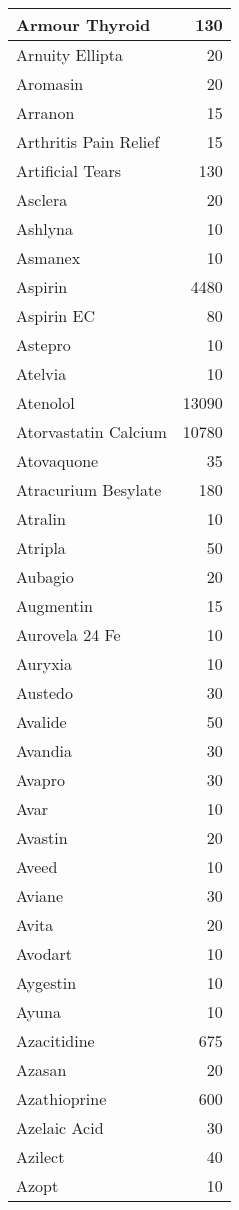 \documentclass[
]{article}
\begin{document}
\begin{table}
\begin{tabular}[t]{l|r}
\hline
Armour Thyroid & 130\\
\hline
Arnuity Ellipta & 20\\
\hline
Aromasin & 20\\
\hline
Arranon & 15\\
\hline
Arthritis Pain Relief & 15\\
\hline
Artificial Tears & 130\\
\hline
Asclera & 20\\
\hline
Ashlyna & 10\\
\hline
Asmanex & 10\\
\hline
Aspirin & 4480\\
\hline
Aspirin EC & 80\\
\hline
Astepro & 10\\
\hline
Atelvia & 10\\
\hline
Atenolol & 13090\\
\hline
Atorvastatin Calcium & 10780\\
\hline
Atovaquone & 35\\
\hline
Atracurium Besylate & 180\\
\hline
Atralin & 10\\
\hline
Atripla & 50\\
\hline
Aubagio & 20\\
\hline
Augmentin & 15\\
\hline
Aurovela 24 Fe & 10\\
\hline
Auryxia & 10\\
\hline
Austedo & 30\\
\hline
Avalide & 50\\
\hline
Avandia & 30\\
\hline
Avapro & 30\\
\hline
Avar & 10\\
\hline
Avastin & 20\\
\hline
Aveed & 10\\
\hline
Aviane & 30\\
\hline
Avita & 20\\
\hline
Avodart & 10\\
\hline
Aygestin & 10\\
\hline
Ayuna & 10\\
\hline
Azacitidine & 675\\
\hline
Azasan & 20\\
\hline
Azathioprine & 600\\
\hline
Azelaic Acid & 30\\
\hline
Azilect & 40\\
\hline
Azopt & 10\\

\end{tabular}
\end{table}
\end{document}
